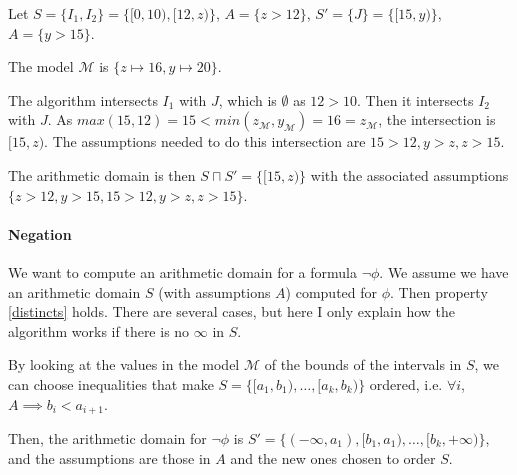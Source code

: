 \begin{example}

Let $S = \{ I_1, I_2\} =  \{[0, 10), [12, z)\}$, $A = \{ z > 12 \}$, $S' = \{J\}= \{[15, y)\}$, $A =
\{ y > 15 \}$.

The model $\mathcal{M}$ is $\{ z \mapsto 16, y \mapsto 20 \}$.

The algorithm intersects $I_1$ with $J$,  which is $\emptyset$ as $12 > 10$. Then it intersects
$I_2$ with $J$. As $max(15, 12) = 15 < min(z_\mathcal{M}, y_\mathcal{M}) = 16 = z_\mathcal{M}$, the
intersection is $[15, z)$. The assumptions needed to do this intersection are $15 > 12, y > z, z >
15$.

The arithmetic domain is then $S\sqcap S' = \{[15, z)\}$ with the associated assumptions $\{z > 12,
y > 15, 15 > 12, y > z, z > 15\}$.

\end{example}

\paragraph{Negation}
We want to compute an arithmetic domain for a formula $\lnot \phi$. We assume we have an arithmetic
domain $S$ (with assumptions $A$) computed for $\phi$. Then property \ref{distincts} holds. There
are several cases, but here I only explain how the algorithm works if there is no $\infty$ in $S$.

By looking at the values in the model $\mathcal{M}$ of the bounds of the intervals in $S$, we can
choose inequalities that make $S = \{[a_1, b_1), \ldots, [a_k, b_k)\}$ ordered, i.e. $\forall i$, $A
\implies b_i < a_{i+1}$.

Then, the arithmetic domain for $\lnot \phi$ is $S' = \{(-\infty, a_1), [b_1, a_1), \ldots, [b_k,
+\infty)\}$, and the assumptions are those in $A$ and the new ones chosen to order $S$.



